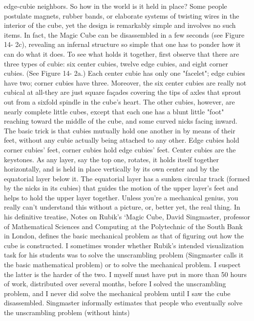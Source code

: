 edge-cubie neighbors. So how in the world is it held in place? Some people postulate
magnets, rubber bands, or elaborate systems of twisting wires in the interior of the
cube, yet the design is remarkably simple and involves no such items.
        In fact, the Magic Cube can be disassembled in a few seconds (see Figure 14-
2c), revealing an infernal structure so simple that one has to ponder how it can do
what it does. To see what holds it together, first observe that there are three types of
cubie: six center cubies, twelve edge cubies, and eight corner cubies. (See Figure 14-
2a.) Each center cubie has only one "facelet"; edge cubies have two; corner cubies
have three. Moreover, the six center cubies are really not cubical at all-they are just
square façades covering the tips of axles that sprout out from a sixfold spindle in the
cube's heart. The other cubies, however, are nearly complete little cubes, except that
each one has a blunt little "foot" reaching toward the middle of the cube, and some
curved nicks facing inward.
        The basic trick is that cubies mutually hold one another in by means of their
feet, without any cubie actually being attached to any other. Edge cubies hold corner
cubies' feet, corner cubies hold edge cubies' feet. Center cubies are the keystones. As
any layer, say the top one, rotates, it holds itself together horizontally, and is held in
place vertically by its own center and by the equatorial layer below it. The equatorial
layer has a sunken circular track (formed by the nicks in its cubies) that guides the
motion of the upper layer's feet and helps to hold the upper layer together. Unless
you're a mechanical genius, you really can't understand this without a picture, or,
better yet, the real thing.
        In his definitive treatise, Notes on Rubik's `Magic Cube, David Singmaster,
professor of Mathematical Sciences and Computing at the Polytechnic of the South
Bank in London, defines the basic mechanical problem as that of figuring out how the
cube is constructed. I sometimes wonder whether Rubik's intended visualization task
for his students was to solve the unscrambling problem (Singmaster calls it the basic
mathematical problem) or to solve the mechanical problem. I suspect the latter is the
harder of the two. I myself must have put in more than 50 hours of work, distributed
over several months, before I solved the unscrambling problem, and I never did solve
the mechanical problem until I saw the cube disassembled. Singmaster informally
estimates that people who eventually solve the unscrambling problem (without hints)
